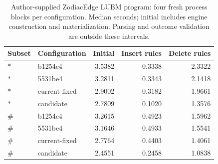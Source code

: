\begin{table}[ht]
\caption{Author-supplied ZodiacEdge LUBM program: four fresh process blocks per configuration. Median seconds; initial includes engine construction and materialization. Parsing and outcome validation are outside these intervals.}
\label{tab:zodiac}
\centering\small
\begin{tabular}{@{}llrrr@{}}
\toprule
Subset & Configuration & Initial & Insert rules & Delete rules \\
\midrule
$\ast$ & b1254c4 & 3.5382 & 0.3338 & 2.3322 \\
$\ast$ & 5531be4 & 3.2811 & 0.3343 & 2.1418 \\
$\ast$ & current-fixed & 2.9002 & 0.3182 & 1.9661 \\
$\ast$ & candidate & 2.7809 & 0.1020 & 1.3576 \\
$\#$ & b1254c4 & 3.2615 & 0.4923 & 1.5962 \\
$\#$ & 5531be4 & 3.1646 & 0.4933 & 1.5541 \\
$\#$ & current-fixed & 2.7764 & 0.4403 & 1.4061 \\
$\#$ & candidate & 2.4551 & 0.2458 & 1.0838 \\
\bottomrule
\end{tabular}
\end{table}
